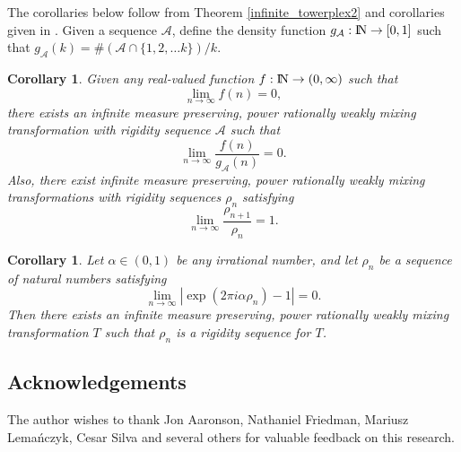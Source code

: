 \documentclass[12pt]{amsart}
\newtheorem{corollary}[theorem]{Corollary}
\begin{document}
The corollaries below follow from Theorem \ref{infinite_towerplex2} 
and corollaries given in \cite{Towerplex1}. 
Given a sequence $\mathcal{A}$, 
define the density function $g_{\mathcal{A}}:{\hbox{\rm\setbox1=\hbox{I}\copy1\kern-.45\wd1 N}} \to [0,1]$ 
such that $g_{\mathcal{A}}(k)={\#(\mathcal{A} \cap \{1,2,\ldots k\})} / {k}$. 
\begin{corollary}
\label{slowrigid}
Given any real-valued function $f:{\hbox{\rm\setbox1=\hbox{I}\copy1\kern-.45\wd1 N}} \to (0,\infty)$ such that 
$$\lim_{n\to \infty}f(n)=0,$$ 
there exists an infinite measure preserving, 
power rationally weakly mixing transformation 
with rigidity sequence $\mathcal{A}$ such that 
$$
\lim_{n\to \infty}\frac{f(n)}{g_{\mathcal{A}}(n)}=0.
$$
Also, there exist infinite measure preserving, 
power rationally weakly mixing transformations 
with rigidity sequences 
$\rho_n$ satisfying 
$$
\lim_{n\to \infty}\frac{\rho_{n+1}}{\rho_n}=1.
$$
\end{corollary}

\begin{corollary}
\label{rotations}
Let $\alpha\in (0,1)$ be any irrational number, and let 
$\rho_n$ be a sequence of natural numbers satisfying 
$$
\lim_{n\to \infty} |\exp{(2\pi i\alpha \rho_n)}-1|=0.
$$
Then there exists an infinite measure preserving, 
power rationally weakly mixing transformation 
$T$ such that $\rho_n$ is a rigidity sequence for $T$. 
\end{corollary}

\subsection*{Acknowledgements}
The author wishes to thank Jon Aaronson, Nathaniel Friedman, 
Mariusz Lema\'nczyk, Cesar Silva and several others 
for valuable feedback on this research. 
\end{document}
